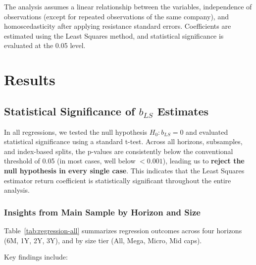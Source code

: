 \documentclass[11pt]{article}
\begin{document}
The analysis assumes a linear relationship between the variables, independence of observations (except for repeated observations of the same company), and homoscedasticity after applying resistance standard errors. Coefficients are estimated using the Least Squares method, and statistical significance is evaluated at the 0.05 level.

\section{Results}

\subsection{Statistical Significance of $b_{LS}$ Estimates}

In all regressions, we tested the null hypothesis $H_0: b_{LS} = 0$ and evaluated statistical significance using a standard t-test. Across all horizons, subsamples, and index-based splits, the p-values are consistently below the conventional threshold of 0.05 (in most cases, well below $<0.001$), leading us to \textbf{reject the null hypothesis in every single case}. This indicates that the Least Squares estimator return coefficient is statistically significant throughout the entire analysis.

\subsubsection{Insights from Main Sample by Horizon and Size}

Table~\ref{tab:regression-all} summarizes regression outcomes across four horizons (6M, 1Y, 2Y, 3Y), and by size tier (All, Mega, Micro, Mid caps).

Key findings include:
\end{document}

